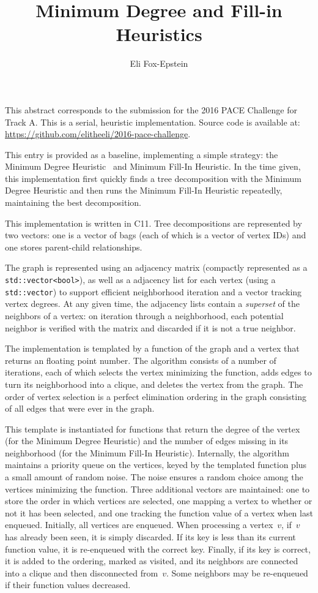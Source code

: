 \documentclass{article}
\title{Minimum Degree and Fill-in Heuristics}
\author{Eli Fox-Epstein}
\newcommand{\CC}{C\nolinebreak\hspace{-.05em}\raisebox{.4ex}{\tiny\bf +}\nolinebreak\hspace{-.10em}\raisebox{.4ex}{\tiny\bf +}}
\begin{document}
\maketitle
\thispagestyle{empty}

This abstract corresponds to the submission for the 2016 PACE Challenge for
Track A. This is a serial, heuristic implementation.  Source code is available
at: \url{https://github.com/elitheeli/2016-pace-challenge}.

This entry is provided as a baseline, implementing a simple strategy: the
Minimum Degree Heuristic~\cite{markowitz1957elimination} and Minimum Fill-In
Heuristic. In the time given, this implementation first quickly finds a tree
decomposition with the Minimum Degree Heuristic and then runs the Minimum
Fill-In Heuristic repeatedly, maintaining the best decomposition.

This implementation is written in \CC{}11. Tree decompositions are represented
by two vectors: one is a vector of bags (each of which is a vector of vertex
IDs) and one stores parent-child relationships.

The graph is represented using an adjacency matrix (compactly represented as a
{\tt std::vector<bool>}), as well as a adjacency list for each vertex (using a
{\tt std::vector}) to support efficient neighborhood iteration and a vector
tracking vertex degrees.  At any given time, the adjacency lists contain a
\emph{superset} of the neighbors of a vertex: on iteration through a
neighborhood, each potential neighbor is verified with the matrix and discarded
if it is not a true neighbor.

The implementation is templated by a function of the graph and a vertex 
that returns an floating point number.  The algorithm consists of a number of
iterations, each of which selects the vertex minimizing the function, adds
edges to turn its neighborhood into a clique, and deletes the vertex from the
graph.  The order of vertex selection is a perfect elimination ordering in the
graph consisting of all edges that were ever in the graph.
  
This template is instantiated for functions that return the degree of the
vertex (for the Minimum Degree Heuristic) and the number of edges missing in
its neighborhood (for the Minimum Fill-In Heuristic).  Internally, the
algorithm maintains a priority queue on the vertices, keyed by the templated
function plus a small amount of random noise. The noise ensures a random choice
among the vertices minimizing the function. Three additional vectors are
maintained: one to store the order in which vertices are selected, one mapping
a vertex to whether or not it has been selected, and one tracking the function
value of a vertex when last enqueued.  Initially, all vertices are enqueued.
When processing a vertex~$v$, if~$v$ has already been seen, it is simply
discarded.  If its key is less than its current function value, it is
re-enqueued with the correct key.  Finally, if its key is correct, it is added
to the ordering, marked as visited, and its neighbors are connected into a
clique and then disconnected from~$v$. Some neighbors may be re-enqueued if
their function values decreased.



\end{document}

